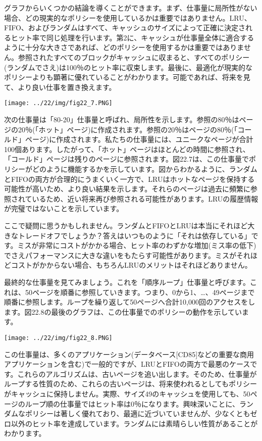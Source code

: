 グラフからいくつかの結論を導くことができます。まず、仕事量に局所性がない場合、どの現実的なポリシーを使用しているかは重要ではありません。LRU、FIFO、およびランダムはすべて、キャッシュのサイズによって正確に決定されるヒット率で同じ処理を行います。第2に、キャッシュが仕事量全体に適合するように十分な大きさであれば、どのポリシーを使用するかは重要ではありません。参照されたすべてのブロックがキャッシュに収まると、すべてのポリシー(ランダムでさえ)は100％のヒット率に収束します。最後に、最適化が現実的なポリシーよりも顕著に優れていることがわかります。可能であれば、将来を見て、より良い仕事を置き換えます。

\texttt{[image: ../22/img/fig22\_7.PNG]}

次の仕事量は「80-20」仕事量と呼ばれ、局所性を示します。参照の80％はページの20％(「ホット」ページ)に作成されます。参照の20％はページの80％(「コールド」ページ)に作成されます。私たちの仕事量には、ユニークなページが合計100個あります。したがって、「ホット」ページはほとんどの時間に参照され、「コールド」ページは残りのページに参\hspace{0pt}\hspace{0pt}照されます。図22.7は、この仕事量でポリシーがどのように機能するかを示しています。図からわかるように、ランダムとFIFOの両方が合理的にうまくいく一方で、LRUはホットなページを保持する可能性が高いため、より良い結果を示します。それらのページは過去に頻繁に参照されているため、近い将来再び参照される可能性があります。LRUの履歴情報が完璧ではないことを示しています。

ここで疑問に思うかもしれません。ランダムとFIFOとLRUは本当にそれほど大きなトレードオフでしょうか？答えはいつものように「それは依存している」です。ミスが非常にコストがかかる場合、ヒット率のわずかな増加(ミス率の低下)でさえパフォーマンスに大きな違いをもたらす可能性があります。ミスがそれほどコストがかからない場合、もちろんLRUのメリットはそれほどありません。

最終的な仕事量を見てみましょう。これを「順序ループ」仕事量と呼びます。これは、50ページを順番に参照していきます。つまり、0から1、\ldots、49ページまで順番に参照します。ループを繰り返して50ページへ合計10,000回のアクセスをします。図22.8の最後のグラフは、この仕事量でのポリシーの動作を示しています。

\texttt{[image: ../22/img/fig22\_8.PNG]}

この仕事量は、多くのアプリケーション(データベース{[}CD85{]}などの重要な商用アプリケーションを含む)で一般的ですが、LRUとFIFOの両方で最悪のケースです。これらのアルゴリズムは、古いページを追い出します。そのため、仕事量がループする性質のため、これらの古いページは、将来使われるとしてもポリシーがキャッシュに保持しません。実際、サイズ49のキャッシュを使用しても、50ページのループ順の仕事量ではヒット率は0％になります。興味深いことに、ランダムなポリシーは著しく優れており、最適に近づいていませんが、少なくともゼロ以外のヒット率を達成しています。ランダムには素晴らしい性質があることがわかります。

